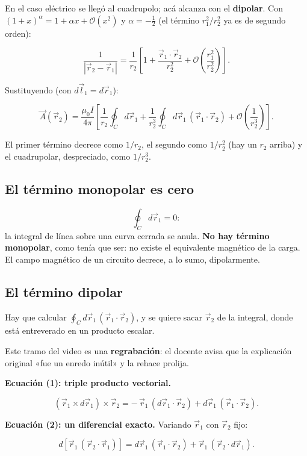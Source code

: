\documentclass[12pt,a4paper]{article}
\begin{document}
En el caso eléctrico se llegó al cuadrupolo; acá alcanza con el \textbf{dipolar}.
Con $(1+x)^\alpha = 1+\alpha x+\mathcal O(x^2)$ y $\alpha = -\tfrac12$ (el
término $r_1^2/r_2^2$ ya es de segundo orden):

\[
\frac{1}{|\vec r_2-\vec r_1|} = \frac{1}{r_2}\left[1 +
\frac{\vec r_1\cdot\vec r_2}{r_2^2} + \mathcal O\!\left(\frac{r_1^2}{r_2^2}\right)\right].
\]

Sustituyendo (con $d\vec l_1 = d\vec r_1$):

\[
\vec A(\vec r_2) = \frac{\mu_0 I}{4\pi}\left[
\frac{1}{r_2}\oint_C d\vec r_1
+ \frac{1}{r_2^3}\oint_C d\vec r_1\,(\vec r_1\cdot\vec r_2)
+ \mathcal O\!\left(\frac{1}{r_2^3}\right)\right].
\]

El primer término decrece como $1/r_2$, el segundo como $1/r_2^2$ (hay un
$r_2$ arriba) y el cuadrupolar, despreciado, como $1/r_2^3$.

\subsection{El término monopolar es cero}

\[
\oint_C d\vec r_1 = 0 :
\]
la integral de línea sobre una curva cerrada se anula. \textbf{No hay término
monopolar}, como tenía que ser: no existe el equivalente magnético de la
carga. El campo magnético de un circuito decrece, a lo sumo, dipolarmente.

\subsection{El término dipolar}

Hay que calcular $\oint_C d\vec r_1\,(\vec r_1\cdot\vec r_2)$, y se quiere
sacar $\vec r_2$ de la integral, donde está entreverado en un producto escalar.

\begin{notebox}
Este tramo del video es una \textbf{regrabación}: el docente avisa que la
explicación original «fue un enredo inútil» y la rehace prolija.
\end{notebox}

\textbf{Ecuación (1): triple producto vectorial.}

\[
(\vec r_1\times d\vec r_1)\times\vec r_2
= -\,\vec r_1\,(d\vec r_1\cdot\vec r_2) + d\vec r_1\,(\vec r_1\cdot\vec r_2).
\]

\textbf{Ecuación (2): un diferencial exacto.} Variando $\vec r_1$ con $\vec r_2$
fijo:

\[
d\!\left[\vec r_1\,(\vec r_2\cdot\vec r_1)\right]
= d\vec r_1\,(\vec r_1\cdot\vec r_2) + \vec r_1\,(\vec r_2\cdot d\vec r_1).
\]
\end{document}
